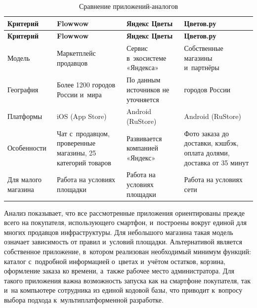 \documentclass[14pt,a4paper]{extarticle}
\begin{document}
\begingroup\small\singlespacing\setlength{\LTpre}{6pt}\setlength{\LTpost}{10pt}
\begin{longtable}{|>{\raggedright\arraybackslash}p{}|>{\raggedright\arraybackslash}p{}|>{\raggedright\arraybackslash}p{}|>{\raggedright\arraybackslash}p{}|}
\caption{Сравнение приложений-аналогов}\label{tab:1.1}\\
\hline
\rowcolor{gray!15}\centering\arraybackslash\bfseries Критерий & \centering\arraybackslash\bfseries Flowwow & \centering\arraybackslash\bfseries Яндекс Цветы & \centering\arraybackslash\bfseries Цветов.ру \\ \hline
\endfirsthead
\hline
\rowcolor{gray!15}\centering\arraybackslash\bfseries Критерий & \centering\arraybackslash\bfseries Flowwow & \centering\arraybackslash\bfseries Яндекс Цветы & \centering\arraybackslash\bfseries Цветов.ру \\ \hline
\endhead
Модель & Маркетплейс продавцов & Сервис в~экосистеме «Яндекса» & Собственные магазины и~партнёры \\ \hline
География & Более 1200 городов России и~мира & По данным источников не уточняется & 219 городов России \\ \hline
Платформы & iOS (App Store) & Android (RuStore) & Android (RuStore) \\ \hline
Особенности & Чат с~продавцом, проверенные магазины, 25 категорий товаров & Развивается компанией «Яндекс» & Фото заказа до доставки, кэшбэк, оплата долями, доставка от 35 минут \\ \hline
Для малого магазина & Работа на условиях площадки & Работа на условиях площадки & Работа на условиях сети \\ \hline
\end{longtable}\endgroup

Анализ показывает, что все рассмотренные приложения ориентированы прежде всего на покупателя, использующего смартфон, и~построены вокруг единой для многих продавцов инфраструктуры. Для небольшого магазина такая модель означает зависимость от правил и~условий площадки. Альтернативой является собственное приложение, в~котором реализован необходимый минимум функций: каталог с~подробной информацией о~цветах и~учётом остатков, корзина, оформление заказа ко времени, а~также рабочее место администратора. Для такого приложения важна возможность запуска как на смартфоне покупателя, так и~на компьютере сотрудника из единой кодовой базы, что приводит к~вопросу выбора подхода к~мультиплатформенной разработке.
\end{document}
